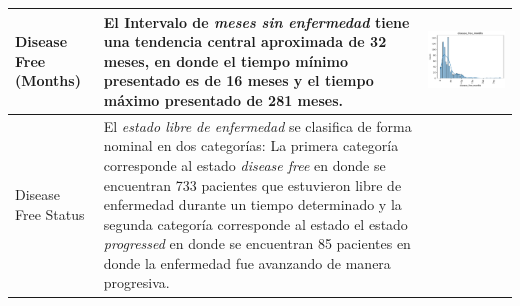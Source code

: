 \begin{table}[!htb]
	\footnotesize
	\begin{threeparttable}
		\begin{tabular}{p{2.5cm} p{7cm} p{6.5cm}} \toprule
			Disease Free (Months)
			& El Intervalo de \textit{meses sin enfermedad} tiene una tendencia central aproximada de 32 meses, en donde el tiempo mínimo presentado es de 16 meses y el tiempo máximo presentado de 281 meses.
			
			& \begin{center}\includegraphics[width=1\linewidth]{NOTEBOOK/IMAGENES_DESCRIPTIVAS/9_disease_free_months}\end{center}
			\\ \hline
			
			Disease Free Status
			& El \textit{estado libre de enfermedad} se clasifica de forma nominal en dos categorías: La primera categoría corresponde al estado \textit{disease free} en donde se encuentran 733 pacientes que estuvieron libre de enfermedad durante un tiempo determinado y la segunda categoría corresponde al estado el estado \textit{progressed} en donde se encuentran 85 pacientes en donde la enfermedad fue avanzando de manera progresiva. 
			

\end{tabular}
\end{threeparttable}
\end{table}
